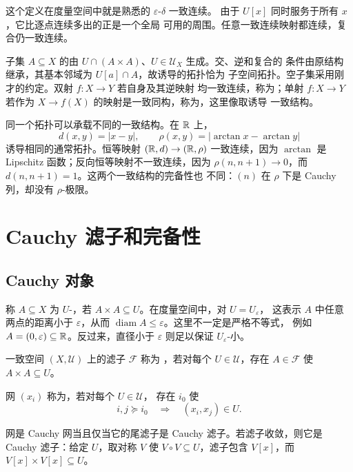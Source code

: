 这个定义在度量空间中就是熟悉的 \(\varepsilon\)-\(\delta\) 一致连续。
由于 \(U[x]\) 同时服务于所有 \(x\)，它比逐点连续多出的正是一个全局
可用的周围。任意一致连续映射都连续，复合仍一致连续。

子集 \(A\subseteq X\) 的由
\(U\cap(A\times A)\)、\(U\in\mathcal U_X\) 生成。交、逆和复合的
条件由原结构继承，其基本邻域为 \(U[a]\cap A\)，故诱导的拓扑恰为
子空间拓扑。空子集采用刚才的约定。双射 \(f:X\to Y\) 若自身及其逆映射
均一致连续，称为；单射 \(f:X\to Y\) 若作为
\(X\to f(X)\) 的映射是一致同构，称为，这里像取诱导
一致结构。

同一个拓扑可以承载不同的一致结构。在 \(\mathbb{R}\) 上，
\[
 d(x,y)=|x-y|,\qquad
 \rho(x,y)=|\arctan x-\arctan y|
\]
诱导相同的通常拓扑。恒等映射 \((\mathbb{R},d)\to(\mathbb{R},\rho)\) 一致连续，因为
\(\arctan\) 是 Lipschitz 函数；反向恒等映射不一致连续，因为
\(\rho(n,n+1)\to0\)，而 \(d(n,n+1)=1\)。这两个一致结构的完备性也
不同：\((n)\) 在 \(\rho\) 下是 Cauchy 列，却没有 \(\rho\)-极限。

\section{Cauchy 滤子和完备性}

\subsection{Cauchy 对象}

称 \(A\subseteq X\) 为 \(U\)-，若
\(A\times A\subseteq U\)。在度量空间中，对 \(U=U_\varepsilon\)，
这表示 \(A\) 中任意两点的距离小于 \(\varepsilon\)，从而
\(\operatorname{diam}A\le\varepsilon\)。这里不一定是严格不等式，
例如 \(A=(0,\varepsilon)\subseteq\mathbb{R}\)。反过来，直径小于
\(\varepsilon\) 则足以保证 \(U_\varepsilon\)-小。

\begin{definition}
一致空间 \((X,\mathcal U)\) 上的滤子 \(\mathcal F\) 称为
，若对每个 \(U\in\mathcal U\)，存在
\(A\in\mathcal F\) 使 \(A\times A\subseteq U\)。

网 \((x_i)\) 称为，若对每个 \(U\in\mathcal U\)，
存在 \(i_0\) 使
\[
 i,j\succcurlyeq i_0\quad\Longrightarrow\quad(x_i,x_j)\in U.
\]
\end{definition}

网是 Cauchy 网当且仅当它的尾滤子是 Cauchy 滤子。若滤子收敛，则它是
Cauchy 滤子：给定 \(U\)，取对称 \(V\) 使
\(V\circ V\subseteq U\)，滤子包含 \(V[x]\)，而
\(V[x]\times V[x]\subseteq U\)。

